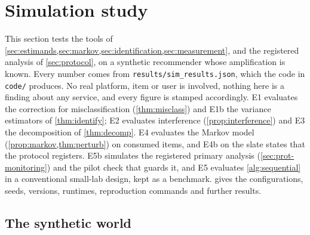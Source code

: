 \providecommand{\Se}{\mathrm{Se}}
\providecommand{\Sp}{\mathrm{Sp}}
\providecommand{\simfit}[1]{\resizebox{\ifdim\width>\linewidth\linewidth\else\width\fi}{!}{#1}}

\section{Simulation study}\label{sec:simulation}

This section tests the tools of \cref{sec:estimands,sec:markov,sec:identification,sec:measurement}, and the registered analysis of \cref{sec:protocol}, on a synthetic recommender whose amplification is known. Every number comes from \texttt{results/sim\_results.json}, which the code in \texttt{code/} produces. No real platform, item or user is involved, nothing here is a finding about any service, and every figure is stamped accordingly. E1 evaluates the correction for misclassification (\cref{thm:misclass}) and E1b the variance estimators of \cref{thm:identify}; E2 evaluates interference (\cref{prop:interference}) and E3 the decomposition of \cref{thm:decomp}. E4 evaluates the Markov model (\cref{prop:markov,thm:perturb}) on consumed items, and E4b on the slate states that the protocol registers. E5b simulates the registered primary analysis (\cref{sec:prot-monitoring}) and the pilot check that guards it, and E5 evaluates \cref{alg:sequential} in a conventional small-lab design, kept as a benchmark.  gives the configurations, seeds, versions, runtimes, reproduction commands and further results.

\subsection{The synthetic world}\label{sec:sim-world}

